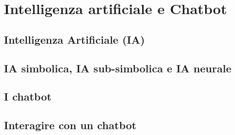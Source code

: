 \section{Intelligenza artificiale e Chatbot}
    \subsection{Intelligenza Artificiale (IA)}
    \subsection{IA simbolica, IA sub-simbolica e IA neurale}
    \subsection{I chatbot}
    \subsection{Interagire con un chatbot}
